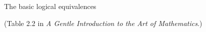 \documentclass{article}
\begin{document}
\thispagestyle{empty}

\centerline{\Large The basic logical equivalences}
\centerline{(Table 2.2 in {\em A Gentle Introduction to the Art of Mathematics}.)}

\vspace{.5in}


\end{document}
